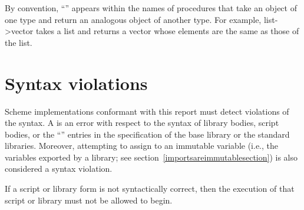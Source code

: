 By convention, ``\ide{->}'' appears within the names of procedures that
take an object of one type and return an analogous object of another type.
For example, {\cf list->vector} takes a list and returns a vector whose
elements are the same as those of the list.

\section{Syntax violations}

Scheme implementations conformant with this report must detect
violations of the syntax.  A  is an error
with respect to the syntax of library bodies, script bodies,
or the ``\exprtype'' entries in the
specification of the base library or the standard libraries.
Moreover, attempting to assign to an immutable variable (i.e., the
variables exported by a library; see
section~\ref{importsareimmutablesection}) is also
considered a syntax violation.

If a script or library form is not syntactically correct, then the
execution of that script or library must not be allowed to begin.

